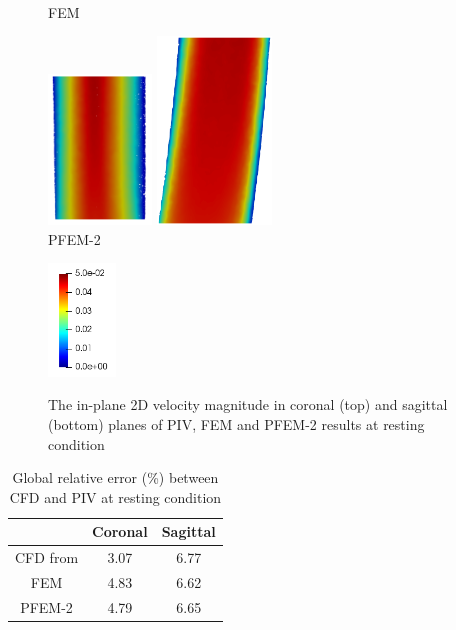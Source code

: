\begin{figure}
\begin{minipage}[c][10cm][c]{0.25\textwidth}
\\FEM
\end{minipage}
\begin{minipage}[c][10cm][c]{0.25\textwidth}
\centering
\vspace*{\fill}
\includegraphics[height=4cm]{imgs/vena_cava/PFEM_coronal_rest.png}
\includegraphics[height=5cm]{imgs/vena_cava/PFEM_sagittal_rest.png}
\\PFEM-2
\end{minipage}
\begin{minipage}[c][10cm][t]{0.1\textwidth}
\vspace*{\fill}
\centering
\includegraphics[height=3cm]{imgs/vena_cava/colormap_rest.png}
\\
\end{minipage}
\caption{The in-plane 2D velocity magnitude in coronal (top) and sagittal (bottom) planes of PIV, FEM and PFEM-2 results at resting condition}
\label{fig:process1}
\end{figure}

\begin{table}[h]
\caption {Global relative error (\%) between CFD and PIV at resting condition} \label{tab:convergence}
\centering
\begin{tabular}{|c|c|c|}
\hline
       & Coronal & Sagittal \\ \hline
CFD from \cite{craven_cfd}  & 3.07    & 6.77     \\ \hline
FEM    & 4.83    & 6.62     \\ \hline
PFEM-2 & 4.79    & 6.65     \\ \hline
\end{tabular}
\end{table}

